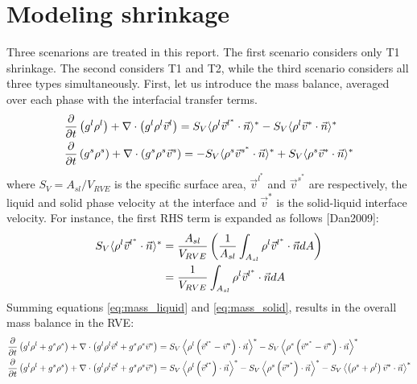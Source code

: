 \documentclass[11pt,a4paper]{article}
\begin{document}
\section{Modeling shrinkage}
Three scenarions are treated in this report. The first scenario considers only T1 shrinkage. The second considers T1 and T2, while the third scenario considers all three 
types simultaneously. First, let us introduce the mass balance, averaged over each phase with the interfacial transfer terms.
\begin{subequations}
\begin{align}
\label{eq:mass_liquid}
& \frac{\partial}{\partial t} \left( g^l \rho^l \right)  + \nabla \cdot \left( g^l \rho^l \vec{v}^l \right) = S_V \langle \rho^l \vec{v}^{l^*} \cdot \vec{n} \rangle^* - S_V \langle \rho^l \vec{v}^* \cdot \vec{n} \rangle^* \\
\label{eq:mass_solid}
& \frac{\partial}{\partial t} \left( g^s \rho^s \right)  + \nabla \cdot \left( g^s \rho^s \vec{v}^s \right) = - S_V \langle \rho^s \vec{v}^{s^*} \cdot \vec{n} \rangle^* + S_V \langle \rho^s \vec{v}^* \cdot \vec{n} \rangle^*
\end{align}
\end{subequations}
where $S_V= A_{sl}/V_{RVE}$ is the specific surface area, $\vec{v}^{l^*}$ and $\vec{v}^{s^*}$ are respectively, the liquid and solid phase velocity at the interface and $\vec{v}^*$ is the solid-liquid interface velocity. For instance, the first RHS term is expanded as follows [Dan2009]:
\begin{subequations}
\begin{align}
S_V \langle \rho^l \vec{v}^{l^*} \cdot \vec{n} \rangle^*
  &= \frac{A_{sl}}{V_{RVE}} \left(  \frac{1}{A_{sl}} \int_{A_{sl}} \rho^l \vec{v}^{l^*} \cdot \vec{n} dA \right) \\
&=\frac{1}{V_{RVE}} \int_{A_{sl}} \rho^l \vec{v}^{l^*} \cdot \vec{n} dA
\end{align}
\end{subequations}
Summing equations \eqref{eq:mass_liquid} and \eqref{eq:mass_solid}, results in the overall mass balance
in the RVE:
\begin{subequations}
\begin{align}
& \frac{\partial}{\partial t} \left( g^l \rho^l + g^s \rho^s \right)   +  \nabla \cdot \left( g^l \rho^l \vec{v}^l + g^s \rho^s \vec{v}^s \right)
   =  S_V \left\langle \rho^l \left( \vec{v}^{l^*}-\vec{v}^{*} \right) \cdot \vec{n} \right\rangle^*  
   -  S_V \left\langle \rho^s \left( \vec{v}^{s^*}-\vec{v}^{*} \right) \cdot \vec{n} \right\rangle^*  \\
& \frac{\partial}{\partial t} \left( g^l \rho^l + g^s \rho^s \right)   +  \nabla \cdot \left( g^l \rho^l \vec{v}^l + g^s \rho^s \vec{v}^s \right)
   =  S_V \left\langle \rho^l \left( \vec{v}^{l^*} \right) \cdot \vec{n} \right\rangle^*  
   -  S_V \left\langle \rho^s \left( \vec{v}^{s^*} \right) \cdot \vec{n} \right\rangle^*  
   -  S_V \left\langle \left( \rho^s+\rho^l \right) \vec{v}^{*} \cdot \vec{n} \right\rangle^* 
\end{align}
\end{subequations}
\end{document}

